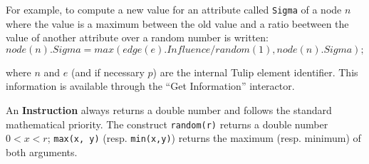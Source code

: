 \documentclass[a4paper,10pt,runningheads]{llncs}
\newcommand{\TULIP}{{\sc Tulip}\xspace}
\begin{document}
For example, to compute a new value for an attribute called {\tt Sigma} of a node $n$ where the value is a maximum between the old value and a ratio beetween the value of another attribute over a random number is written: 
\[ 
node(n).Sigma = max(edge(e).Influence/random(1),node(n).Sigma);
\]

where $n$ and $e$ (and if necessary $p$) are the internal \TULIP element identifier. This 
information is available through the ``Get Information'' interactor.

An {\bf Instruction} always returns a double number and  follows the standard 
mathematical priority. 
The construct {\tt random(r)} returns a double number $0 < x < r$; {\tt max(x, y)} (resp. 
{\tt min(x,y)}) returns the maximum (resp. minimum) of both arguments.



\end{document}
